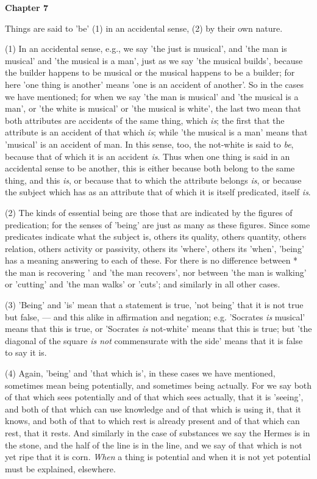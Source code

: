 \textbf{Chapter 7}

Things are said to 'be' (1) in an accidental sense, (2) by their own nature.

(1) In an accidental sense, e.g., we say 'the just is musical', and 'the man is musical' and 'the musical is a man', just as we say 'the musical builds', because the builder happens to be musical or the musical happens to be a builder; for here 'one thing is another' means 'one is an accident of another'. So in the cases we have mentioned; for when we say 'the man is musical' and 'the musical is a man', or 'the white is musical' or 'the musical is white', the last two mean that both attributes are accidents of the same thing, which \emph{is}; the first that the attribute is an accident of that which \emph{is}; while 'the musical is a man' means that 'musical' is an accident of man. In this sense, too, the not-white is said to \emph{be}, because that of which it is an accident \emph{is}. Thus when one thing is said in an accidental sense to be another, this is either because both belong to the same thing, and this \emph{is}, or because that to which the attribute belongs \emph{is}, or because the subject which has as an attribute that of which it is itself predicated, itself \emph{is}.

(2) The kinds of essential being are those that are indicated by the figures of predication; for the senses of 'being' are just as many as these figures. Since some predicates indicate what the subject is, others its quality, others quantity, others relation, others activity or passivity, others its 'where', others its 'when', 'being' has a meaning answering to each of these.
For there is no difference between * the man is recovering ' and 'the man recovers', nor between 'the man is walking' or 'cutting' and 'the man walks' or 'cuts'; and similarly in all other cases.

(3) 'Being' and 'is' mean that a statement is true, 'not being' that it is not true but false, — and this alike in affirmation and negation; e.g. 'Socrates \emph{is} musical' means that this is true, or 'Socrates \emph{is} not-white' means that this is true; but 'the diagonal of the square \emph{is not} commensurate with the side' means that it is false to say it is.

(4) Again, 'being' and 'that which is', in these cases we have mentioned, sometimes mean being potentially, and sometimes being actually. For we say both of that which sees
potentially and of that which sees actually, that it is 'seeing', and both of that which can use knowledge and of that which is using it, that it knows, and both of that to which rest is already present and of that which can rest, that it rests. And similarly in the case of substances we say the Hermes is in the stone, and the half of the line is in the line, and we say of that which is not yet ripe that it is corn. \emph{When} a thing is potential and when it is not yet potential must be explained, elsewhere.

